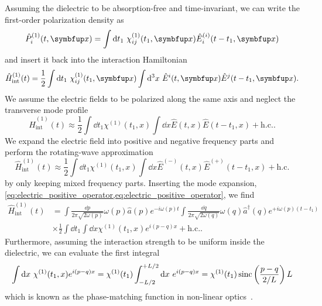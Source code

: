 Assuming the dielectric to be absorption-free and time-invariant, we can write the first-order polarization density as
\begin{equation}
	\hat{P}_i^{(1)}(t,\vb{x})
	=
	\int\dd{t_1}
	\chi_{ij}^{(1)}(t_1,\vb{x})
	\hat{E}_i^{(i)}(t-t_1,\vb{x})
\end{equation}
and insert it back into the interaction Hamiltonian
\begin{equation}
	\hat{H}_\text{int}^{(1)}(t)
	=	
	\frac{1}{2}
	\int\dd{t_1}
	\chi_{ij}^{(1)}(t_1,\vb{x})
	\int\dd[3]{x}
	\hat{E}^i(t,\vb{x})
	\hat{E}^j(t-t_1,\vb{x})
	.
\end{equation}
We assume the electric fields to be polarized along the same axis and neglect the transverse mode profile
\begin{equation}
	\hat{H}_\text{int}^{(1)}(t)
	\approx
	\frac{1}{2}
	\int\dd{t_1}
	\chi^{(1)}(t_1,x)
	\int\dd{x}
	\hat{E}(t,x)
	\hat{E}(t-t_1,x)
	+
	\text{h.c.}
	.
\end{equation}
We expand the electric field into positive and negative frequency parts and perform the rotating-wave approximation
\begin{equation}
	\hat{H}_\text{int}^{(1)}(t)
	\approx
	\frac{1}{2}
	\int\dd{t_1}
	\chi^{(1)}(t_1,x)
	\int\dd{x}
	\hat{E}^{(-)}(t,x)
	\hat{E}^{(+)}(t-t_1,x)
	+
	\text{h.c.}
\end{equation}
by only keeping mixed frequency parts.
Inserting the mode expansion, \cref{eq:electric_positive_operator,eq:electric_positive_operator}, we find
\begin{equation}
	\begin{split}
		\hat{H}_\text{int}^{(1)}(t)
		&=
		\int\frac{\dd{p}}{2\pi\sqrt{2\omega(p)}}
		\omega(p)
		\hat{a}(p)
		e^{-i\omega(p)t}
		\int\frac{\dd{q}}{2\pi\sqrt{2\omega(q)}}
		\omega(q)
		\hat{a}^\dagger(q)
		e^{+i\omega(p)(t-t_1)}
		\\
		&\times
		\frac{1}{2}
		\int\dd{t_1}
		\int\dd{x}
		\chi^{(1)}(t_1,x)
		e^{i(p-q)x}
		+
		\text{h.c.}
		.
	\end{split}
\end{equation}
Furthermore, assuming the interaction strength to be uniform inside the dielectric, we can evaluate the first integral
\begin{equation}
	\int\dd{x}
	\chi^{(1)}(t_1,x)
	e^{i(p-q)x}
	=
	\chi^{(1)}(t_1)
	\int_{-L/2}^{+L/2}\dd{x}
	e^{i(p-q)x}
	=
	\chi^{(1)}(t_1)
	\sinc\left(\frac{p-q}{2/L}\right)
	L
\end{equation}
which is known as the phase-matching function in non-linear optics~\cite[p.~33]{QuesadaMejia2015}.
